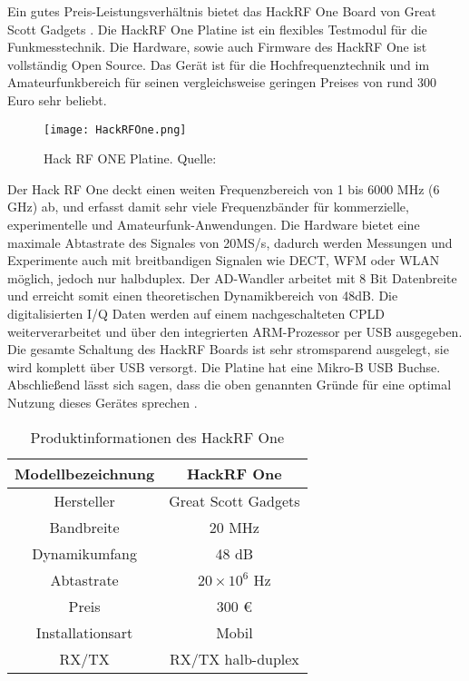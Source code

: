 Ein gutes Preis-Leistungsverhältnis bietet das HackRF One Board von Great Scott Gadgets \cite{greatscott}. Die HackRF One Platine ist ein flexibles Testmodul für die Funkmesstechnik. Die Hardware, sowie auch Firmware des HackRF One ist vollständig Open Source.  Das Gerät ist für die Hochfrequenztechnik und im Amateurfunkbereich für seinen vergleichsweise geringen Preises von rund 300 Euro sehr beliebt.\\

\begin{figure}[H]
	\centering
	\texttt{[image: HackRFOne.png]}
	\caption[Hack RF ONE Platine]{Hack RF ONE Platine. Quelle: \cite{wimo:2018}} 
	\label{HackRFOne}
\end{figure}

Der Hack RF One deckt einen weiten Frequenzbereich von 1 bis 6000 MHz (6 GHz) ab, und erfasst damit sehr viele Frequenzbänder für kommerzielle, experimentelle und Amateurfunk-Anwendungen. Die Hardware bietet eine maximale Abtastrate des Signales von 20MS/s, dadurch werden Messungen und Experimente auch mit breitbandigen Signalen wie DECT, WFM oder WLAN möglich, jedoch nur halbduplex. Der AD-Wandler arbeitet mit 8 Bit Datenbreite und erreicht somit einen theoretischen Dynamikbereich von 48dB. Die digitalisierten I/Q Daten werden auf einem nachgeschalteten CPLD weiterverarbeitet und über den integrierten ARM-Prozessor per USB ausgegeben. Die gesamte Schaltung des HackRF Boards ist sehr stromsparend ausgelegt, sie wird komplett über USB versorgt. Die Platine hat eine Mikro-B USB Buchse. Abschließend lässt sich sagen, dass die oben genannten Gründe für eine optimal Nutzung dieses Gerätes sprechen \cite{wimo:2018}.\\

\begin{table}[ht]
	\centering
	\begin{tabular}{c|c}
		Modellbezeichnung & HackRF One  \\
		\hline
		Hersteller & Great Scott Gadgets\\ 
		\hline 
		Bandbreite & 20 MHz \\ 
		\hline 
		Dynamikumfang & 48 dB \\ %
		\hline 
		Abtastrate & \( 20 \times 10^{6} \) Hz \\ 
		\hline 
		Preis &  300 \euro\\ 
		\hline 
		Installationsart & Mobil \\ 
		\hline 
		RX/TX & RX/TX halb-duplex \\ 
	\end{tabular} 
	\caption{Produktinformationen des HackRF One}
\end{table}

